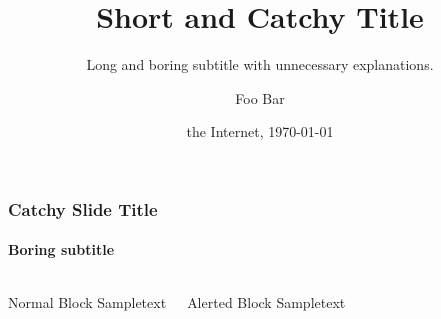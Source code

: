 \documentclass[10pt]{beamer}
\title{Short and Catchy Title}
\subtitle{Long and boring subtitle with unnecessary explanations.}
\author[F. Bar]{Foo Bar}
\institute[Baz Inst.]{Baz Insititute}
\date{the Internet, \today}
\begin{document}
\frame[plain]{\titlepage}

\begin{frame}[t]
\frametitle{Catchy Slide Title}
\framesubtitle{Boring subtitle}
\begin{columns}[T]
    \begin{block}{Normal Block}
      Sampletext
    \end{block}
    \begin{alertblock}{Alerted Block}
      Sampletext
    \end{alertblock}
\end{columns}
\end{frame}
\end{document}
